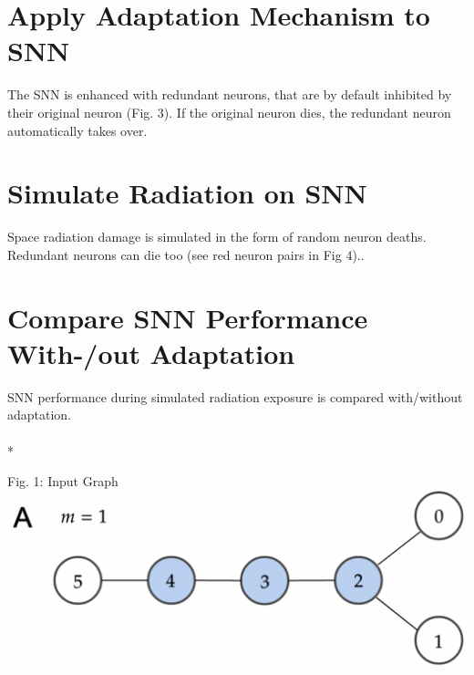 {\section{Apply Adaptation Mechanism to SNN}\label{subsec:adaptation}
The SNN is enhanced with redundant neurons, that are by default inhibited by their original neuron (Fig. 3). If the original neuron dies, the redundant neuron automatically takes over. 


\section{Simulate Radiation on SNN}\label{subsec:}
Space radiation damage is simulated in the form of random neuron deaths. Redundant neurons can die too (see red neuron pairs in Fig 4).. \vspace{-7em}
\section{Compare SNN Performance With-/out Adaptation}\label{subsec:}
SNN performance during simulated radiation exposure is compared with/without adaptation.\\
\\*
\vspace{-45em}
\begin{rudifig}{0.49\hsize}{Fig. 1: Input Graph}
    \hspace{-1.5em}
    \includegraphics[width=1.1\linewidth]{latex/Images/input_graph_G_6_0_alternative1.png}

\end{rudifig}}
